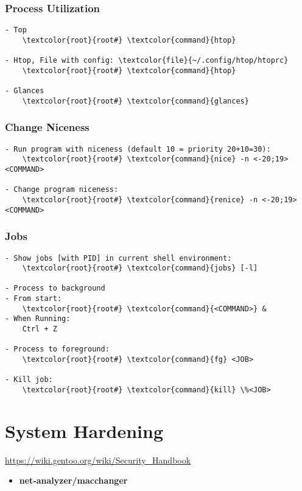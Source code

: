 \documentclass[10pt, a4paper, onecolumn, openany]{book}         %
\begin{document}
\subsection{Process Utilization}
\begin{Verbatim}[commandchars=\\\{\}]
- Top
    \textcolor{root}{root#} \textcolor{command}{htop}

- Htop, File with config: \textcolor{file}{~/.config/htop/htoprc}
    \textcolor{root}{root#} \textcolor{command}{htop}
    
- Glances
    \textcolor{root}{root#} \textcolor{command}{glances}
\end{Verbatim}

\subsection{Change Niceness}
\begin{Verbatim}[commandchars=\\\{\}]
- Run program with niceness (default 10 = priority 20+10=30):
    \textcolor{root}{root#} \textcolor{command}{nice} -n <-20;19> <COMMAND>

- Change program niceness:
    \textcolor{root}{root#} \textcolor{command}{renice} -n <-20;19> <COMMAND>
\end{Verbatim}


\subsection{Jobs}
\begin{Verbatim}[commandchars=\\\{\}]
- Show jobs [with PID] in current shell environment:
    \textcolor{root}{root#} \textcolor{command}{jobs} [-l]

- Process to background
- From start:
    \textcolor{root}{root#} \textcolor{command}{<COMMAND>} &
- When Running:
    Ctrl + Z

- Process to foreground:
    \textcolor{root}{root#} \textcolor{command}{fg} <JOB>

- Kill job:
    \textcolor{root}{root#} \textcolor{command}{kill} \%<JOB>
\end{Verbatim}



\chapter{System Hardening}%
\underline{\url{https://wiki.gentoo.org/wiki/Security_Handbook}}
\begin{itemize}
    \item \textbf{net-analyzer/macchanger}
\end{itemize}
\end{document}
